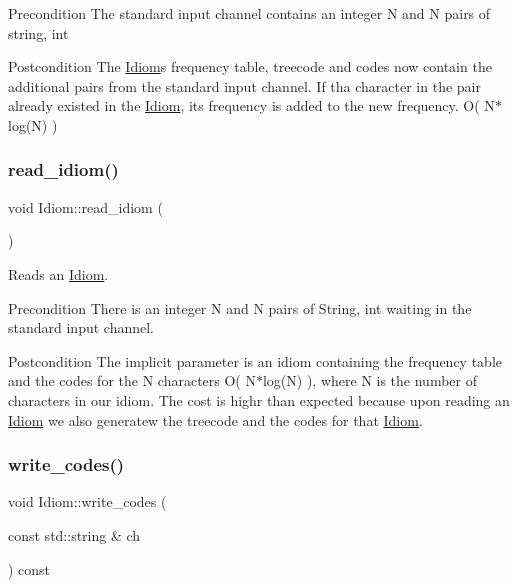 \begin{DoxyPrecond}{Precondition}
The standard input channel contains an integer N and N pairs of string, int 
\end{DoxyPrecond}
\begin{DoxyPostcond}{Postcondition}
The \hyperlink{classIdiom}{Idiom}\textquotesingle{}s frequency table, treecode and codes now contain the additional pairs from the standard input channel. If tha character in the pair already existed in the \hyperlink{classIdiom}{Idiom}, its frequency is added to the new frequency.  O( N$\ast$log(\+N) ) 
\end{DoxyPostcond}
\mbox{\label{classIdiom_a13134381f333552d2283acf188b2285c}} 
\subsubsection{\texorpdfstring{read\+\_\+idiom()}{read\_idiom()}}
{\footnotesize\ttfamily void Idiom\+::read\+\_\+idiom (\begin{DoxyParamCaption}{ }\end{DoxyParamCaption})}



Reads an \hyperlink{classIdiom}{Idiom}. 

\begin{DoxyPrecond}{Precondition}
There is an integer N and N pairs of String, int waiting in the standard input channel. 
\end{DoxyPrecond}
\begin{DoxyPostcond}{Postcondition}
The implicit parameter is an idiom containing the frequency table and the codes for the N characters  O( N$\ast$log(\+N) ), where N is the number of characters in our idiom. The cost is highr than expected because upon reading an \hyperlink{classIdiom}{Idiom} we also generatew the treecode and the codes for that \hyperlink{classIdiom}{Idiom}. 
\end{DoxyPostcond}
\mbox{\label{classIdiom_afc92894b2350b0394b0e4d44f23095b2}} 
\subsubsection{\texorpdfstring{write\+\_\+codes()}{write\_codes()}}
{\footnotesize\ttfamily void Idiom\+::write\+\_\+codes (\begin{DoxyParamCaption}\item[{const std\+::string \&}]{ch }\end{DoxyParamCaption}) const}



